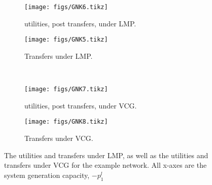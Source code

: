 \begin{figure}[]
	\begin{subfigure}{.48\linewidth}
		\texttt{[image: figs/GNK6.tikz]}%
		\caption{ utilities, post transfers, under LMP.}\label{fig:1e}
	\end{subfigure}
	\begin{subfigure}{.48\linewidth}
		\texttt{[image: figs/GNK5.tikz]}%
		\caption{ Transfers under LMP.}\label{fig:1f}
	\end{subfigure}
\vspace{5mm}\\
	\begin{subfigure}{.48\linewidth}
		\texttt{[image: figs/GNK7.tikz]}%
		\caption{ utilities, post transfers, under VCG.}\label{fig:1g}
	\end{subfigure}
	\begin{subfigure}{.48\linewidth}
		\texttt{[image: figs/GNK8.tikz]}%
		\caption{ Transfers under VCG.}\label{fig:1h}
	\end{subfigure}
	\vspace{0.3\baselineskip}
	\caption[Power-levels and utility imputations under LMP and VCG for example network]{The utilities and transfers under LMP, as well as the utilities and transfers under VCG for the example network. All x-axes are the system generation capacity, $-p_1^l$}\label{fig:11}
\end{figure}

